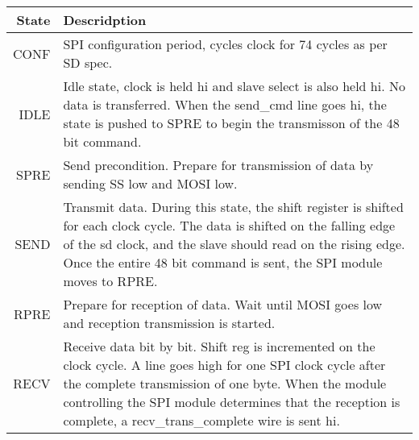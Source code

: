 \documentclass[../../ProjectDocumentation.tex]{subfiles}
\begin{document}
\begin{tabular}{|r|p{7cm}|}
\hline
\textbf{State} & \textbf{Descridption} \\
\hline
CONF & SPI configuration period, cycles clock for 74 cycles as per SD spec. \\
\hline
IDLE & Idle state, clock is held hi and slave select is also held hi. No data is transferred. When the send\_cmd line goes hi, the state is pushed to SPRE to begin the transmisson of the 48 bit command. \\
\hline
SPRE & Send precondition. Prepare for transmission of data by sending SS low and MOSI low.\\
\hline
SEND & Transmit data. During this state, the shift register is shifted for each clock cycle. The data is shifted on the falling edge of the sd clock, and the slave should read on the rising edge. Once the entire 48 bit command is sent, the SPI module moves to RPRE.\\
\hline
RPRE & Prepare for reception of data. Wait until MOSI goes low and reception transmission is started.\\
\hline
RECV & Receive data bit by bit. Shift reg is incremented on the clock cycle. A line goes high for one SPI clock cycle after the complete transmission of one byte. When the module controlling the SPI module determines that the reception is complete, a recv\_trans\_complete wire is sent hi.\\
\hline
\end{tabular}
\end{document}
